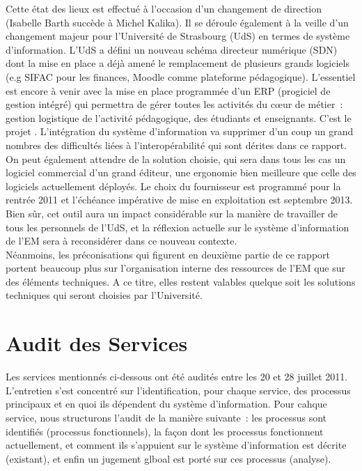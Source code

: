 \documentclass{book}
\begin{document}
Cette état des lieux est effectué à l'occasion d'un changement de direction
(Isabelle Barth succède à Michel Kalika). Il se déroule également à la veille
d'un changement majeur pour l'Université de Strasbourg (UdS) en termes de 
système d'information. L'UdS a défini un nouveau schéma directeur numérique
(SDN) dont la mise en place a déjà amené le remplacement de plusieurs grands
logiciels (e.g SIFAC pour les finances, Moodle comme plateforme pédagogique).
L'essentiel est encore à venir avec la mise en place programmée d'un ERP
(progiciel de gestion intégré) qui permettra de gérer toutes les activités
du c{\oe}ur de métier~: gestion logistique de l'activité pédagogique, des
étudiants et enseignants. C'est le projet . L'intégration
du système d'information va supprimer d'un coup un grand nombres des
difficultés liées à l'interopérabilité qui sont dérites dans ce rapport.
On peut également attendre de la solution choisie, qui sera dans tous les
cas un logiciel commercial d'un grand éditeur, une ergonomie bien meilleure
que celle des logiciels actuellement déployés.
Le choix du fournisseur est programmé pour la rentrée 2011 et l'échéance
impérative de mise en exploitation est septembre 2013.\\

Bien sûr, cet outil aura un impact considérable sur la manière de travailler
de tous les personnels de l'UdS, et la réflexion actuelle sur le système
d'information de l'EM sera à reconsidérer dans ce nouveau contexte.\\

Néanmoins, les préconisations qui figurent en deuxième partie de ce rapport
portent beaucoup plus sur l'organisation interne des ressources de l'EM
que sur des éléments techniques. A ce titre, elles restent valables
quelque soit les solutions techniques qui seront choisies par l'Université.


 

\chapter{Audit des Services}
 
Les services mentionnés ci-dessous ont été audités entre les 20 et 28 juillet 2011.
L'entretien s'est concentré sur l'identification, pour chaque service, des processus 
principaux et en quoi ils dépendent du système d'information. Pour cahque service,
nous structurons l'audit de la manière suivante~: les processus sont identifiés
(processus fonctionnels), la façon dont les processus fonctionnent actuellement, 
et comment ils s'appuient sur le système d'information est décrite (existant), 
et enfin un jugement glboal est porté sur ces processus (analyse).
\end{document}
